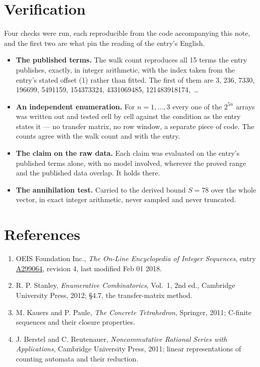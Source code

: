 \documentclass[11pt]{article}
\theoremstyle{definition}
\begin{document}
\section{Verification}

Four checks were run, each reproducible from the code accompanying this note, and the first two are what pin the reading of the entry's English.

\begin{itemize}

\item {\bfseries The published terms.} The walk count reproduces all 15 terms the entry publishes, exactly, in integer arithmetic, with the index taken from the entry's stated offset (1) rather than fitted. The first of them are 3, 236, 7330, 196699, 5491159, 154373324, 4331069485, 121483918174,~\dots

\item {\bfseries An independent enumeration.} For $n = 1,\dots,3$ every one of the $2^{5n}$ arrays was written out and tested cell by cell against the condition as the entry states it --- no transfer matrix, no row window, a separate piece of code. The counts agree with the walk count and with the entry.

\item {\bfseries The claim on the raw data.} Each claim was evaluated on the entry's published terms alone, with no model involved, wherever the proved range and the published data overlap. It holds there.

\item {\bfseries The annihilation test.} Carried to the derived bound $S = 78$ over the whole vector, in exact integer arithmetic, never sampled and never truncated.

\end{itemize}

\section{References}

\begin{enumerate}

\item OEIS Foundation Inc., \emph{The On-Line Encyclopedia of Integer Sequences}, entry \href{https://oeis.org/A299064}{A299064}, revision 4, last modified Feb 01 2018.

\item R. P. Stanley, \emph{Enumerative Combinatorics}, Vol.~1, 2nd ed., Cambridge University Press, 2012; \S4.7, the transfer-matrix method.

\item M. Kauers and P. Paule, \emph{The Concrete Tetrahedron}, Springer, 2011; C-finite sequences and their closure properties.

\item J. Berstel and C. Reutenauer, \emph{Noncommutative Rational Series with Applications}, Cambridge University Press, 2011; linear representations of counting automata and their reduction.

\end{enumerate}
\end{document}
